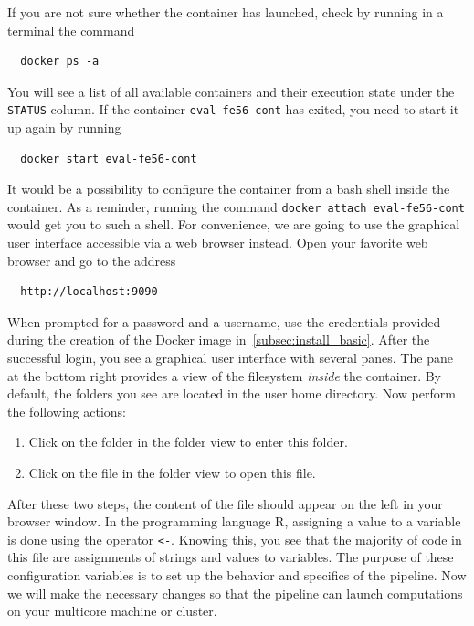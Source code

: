 \documentclass[12pt,a4paper]{scrartcl}
\begin{document}
 If you are not sure whether the container has launched, check by running in a terminal the command
\begin{verbatim}
  docker ps -a
\end{verbatim}
You will see a list of all available containers and their execution state under the \verb#STATUS# column.
If the container \verb#eval-fe56-cont# has exited, you need to start it up again by running
\begin{verbatim}
  docker start eval-fe56-cont
\end{verbatim}
It would be a possibility to configure the container from a bash shell inside the container.
As a reminder, running the command \verb#docker attach eval-fe56-cont# would get you to such a shell.
For convenience, we are going to use the graphical user interface accessible via a web browser instead.
Open your favorite web browser and go to the address
\begin{verbatim}
  http://localhost:9090
\end{verbatim}
When prompted for a password and a username, use the credentials provided during the creation of the Docker image in~\cref{subsec:install_basic}.
After the successful login, you see a graphical user interface with several panes.
The pane at the bottom right provides a view of the filesystem \textit{inside} the container.
By default, the folders you see are located in the user home directory.
Now perform the following actions:
\begin{enumerate}
  \item Click on the folder  in the folder view to enter this folder.
  \item Click on the file  in the folder view to open this file.
\end{enumerate}
After these two steps, the content of the file  should appear on the left in your browser window.
In the programming language R, assigning a value to a variable is done using the operator \verb#<-#.
Knowing this, you see that the majority of code in this file are assignments of strings and values to variables.
The purpose of these configuration variables is to set up the behavior and specifics of the pipeline.
Now we will make the necessary changes so that the pipeline can launch computations on your multicore machine or cluster.
\end{document}
